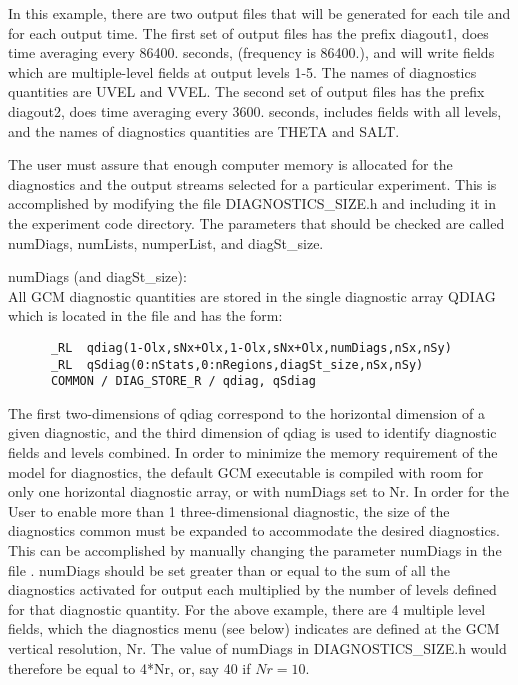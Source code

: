 \noindent
In this example, there are two output files that will be generated for
each tile and for each output time. The first set of output files has
the prefix diagout1, does time averaging every 86400. seconds,
(frequency is 86400.), and will write fields which are multiple-level
fields at output levels 1-5. The names of diagnostics quantities are
UVEL and VVEL.  The second set of output files has the prefix
diagout2, does time averaging every 3600. seconds, includes fields
with all levels, and the names of diagnostics quantities are THETA and SALT.

\noindent
The user must assure that enough computer memory is allocated for the
diagnostics and the output streams selected for a particular
experiment.  This is accomplished by modifying the file
DIAGNOSTICS\_SIZE.h and including it in the experiment code directory.
The parameters that should be checked are called numDiags, numLists,
numperList, and diagSt\_size.

\noindent numDiags (and diagSt\_size): \\
\noindent All GCM diagnostic quantities are stored in the single diagnostic array QDIAG
which is located in the file
and has the form:\\
\begin{verbatim}
      _RL  qdiag(1-Olx,sNx+Olx,1-Olx,sNx+Olx,numDiags,nSx,nSy)
      _RL  qSdiag(0:nStats,0:nRegions,diagSt_size,nSx,nSy)
      COMMON / DIAG_STORE_R / qdiag, qSdiag
\end{verbatim}
\noindent
The first two-dimensions of qdiag correspond to the horizontal
dimension of a given diagnostic, and the third dimension of qdiag is
used to identify diagnostic fields and levels combined. In order to
minimize the memory requirement of the model for diagnostics, the
default GCM executable is compiled with room for only one horizontal
diagnostic array, or with numDiags set to Nr. In order for the User to
enable more than 1 three-dimensional diagnostic, the size of the
diagnostics common must be expanded to accommodate the desired
diagnostics.  This can be accomplished by manually changing the
parameter numDiags in the file
.
numDiags should be set greater than or equal to the sum of all the
diagnostics activated for output each multiplied by the number of
levels defined for that diagnostic quantity.  For the above example,
there are 4 multiple level fields, which the diagnostics menu (see
below) indicates are defined at the GCM vertical resolution, Nr. The
value of numDiags in DIAGNOSTICS\_SIZE.h would therefore be equal to
4*Nr, or, say 40 if $Nr=10$.

